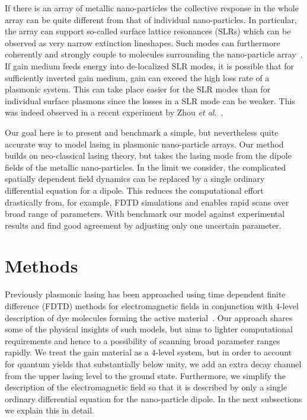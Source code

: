 \documentclass{iopart}
\begin{document}
If there is an array of metallic nano-particles the collective response in the whole array can be quite different from that of individual nano-particles. In particular,
the array can support so-called surface lattice resonances (SLRs) which can be 
observed as very narrow extinction lineshapes. Such modes can furthermore
coherently and strongly couple to molecules surrounding the nano-particle array~\cite{vakevainen_plasmonic_2014,shi_spatial_2014}.
If gain medium feeds energy into de-localized SLR modes, it is possible that
for sufficiently inverted gain medium, gain can exceed the high loss rate
of a plasmonic system. This can take place easier for the SLR modes than for 
individual surface plasmons since the losses in a SLR mode can be weaker.
This was indeed observed in a recent experiment by Zhou {\it et al.}~\cite{zhou_lasing_2013}.


Our goal here is to present and benchmark a simple, but nevertheless
quite accurate way to model lasing in plasmonic nano-particle arrays.
Our method builds on neo-classical lasing theory, but takes the lasing
mode from the dipole fields of the metallic nano-particles. In the limit we consider, the complicated spatially dependent field dynamics can be replaced
by a single ordinary differential equation for a dipole.
This reduces the computational effort drastically from, for example, FDTD
simulations and enables rapid scans over broad range of parameters.
With benchmark our model against experimental results and find good agreement by adjusting only one uncertain parameter.


\section{Methods}
Previously plasmonic lasing has been approached using time dependent finite difference (FDTD)
methods for electromagnetic fields in conjunction with $4$-level description of dye molecules
forming the active material~\cite{dridi_model_2013}. Our approach shares some of the physical insights of
such models, but aims to lighter computational requirements and hence to a possibility
of scanning broad parameter ranges rapidly. We treat the gain material as a $4$-level system, but
in order to account for quantum yields that substantially below unity, we 
add an extra decay channel from the upper lasing level to the ground state. Furthermore, we simplify the
description of the electromagnetic field so that it is described by only a single ordinary differential equation
for the nano-particle dipole. In the next subsections we explain this in detail.
\end{document}
